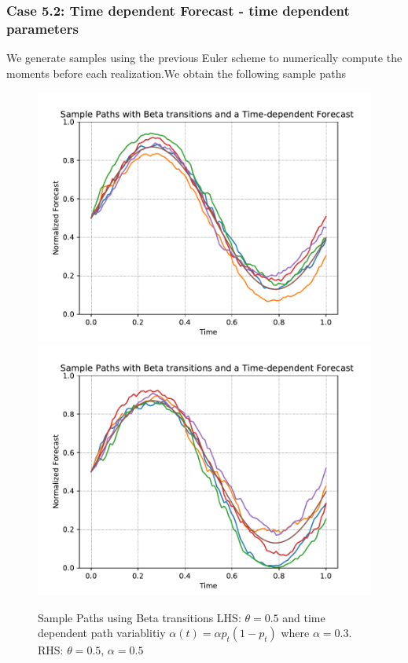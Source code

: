 \documentclass[aspectratio=169]{beamer}\usepackage[utf8]{inputenc}
\begin{document}
\begin{frame}\frametitle{ Case 5.2: Time dependent Forecast - time dependent parameters }
We generate samples using the previous Euler scheme to numerically compute the moments before each realization.We obtain the following sample paths
\begin{figure}
    \includegraphics[scale=0.33]{Figures/sample_paths_beta_flex_0503.pdf}
        \includegraphics[scale=0.33]{Figures/sample_paths_beta_flex_0505.pdf}
      
  \caption{ Sample Paths using Beta transitions LHS: $\theta = 0.5$ and time dependent path variablitiy $\alpha (t) =  \alpha p_t (1-p_t)$ where $\alpha=0.3$. RHS:  $\theta = 0.5$, $\alpha=0.5$   }
\end{figure}

\end{frame}
\end{document}
